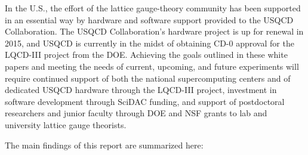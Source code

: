 In the U.S., the effort of the lattice gauge-theory community has been supported in an essential way by hardware and software support provided to the USQCD Collaboration.  The USQCD Collaboration's hardware project is up for renewal in 2015, and USQCD is currently in the midst of obtaining CD-0 approval for the LQCD-III project from the DOE.  Achieving the goals outlined in these white papers and meeting the needs of current, upcoming, and future experiments will require continued support of both the national supercomputing centers and of dedicated USQCD hardware through the LQCD-III project, investment in software development through SciDAC funding, and support of postdoctoral researchers and junior faculty through DOE and NSF grants to lab and university lattice gauge theorists.   

The main findings of this report are summarized here:

